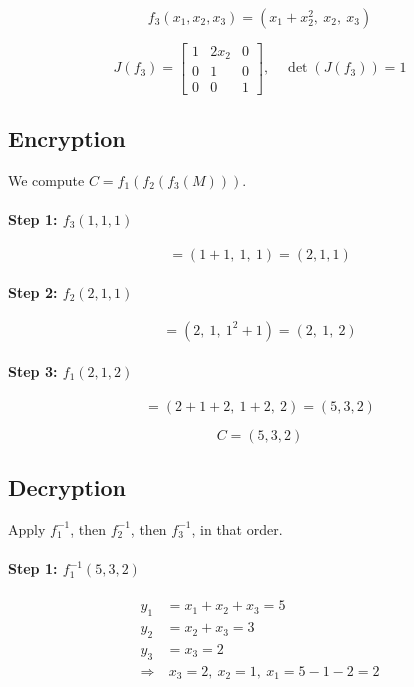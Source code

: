 \documentclass[12pt]{article}
\begin{document}
\[
f_3(x_1, x_2, x_3) = (x_1 + x_2^2,\ x_2,\ x_3)
\]

\[
J(f_3) =
\begin{bmatrix}
1 & 2x_2 & 0 \\
0 & 1 & 0 \\
0 & 0 & 1
\end{bmatrix}, \quad \det(J(f_3)) = 1
\]

\subsection*{Encryption}
We compute \( C = f_1(f_2(f_3(M))) \).

\paragraph{Step 1: \( f_3(1, 1, 1) \)}

\[
= (1 + 1,\ 1,\ 1) = (2, 1, 1)
\]

\paragraph{Step 2: \( f_2(2, 1, 1) \)}

\[
= (2,\ 1,\ 1^2 + 1) = (2,\ 1,\ 2)
\]

\paragraph{Step 3: \( f_1(2, 1, 2) \)}

\[
= (2 + 1 + 2,\ 1 + 2,\ 2) = (5, 3, 2)
\]

\[
C = (5, 3, 2)
\]

\subsection*{Decryption}
Apply \( f_1^{-1} \), then \( f_2^{-1} \), then \( f_3^{-1} \), in that order.

\paragraph{Step 1: \( f_1^{-1}(5, 3, 2) \)}

\[
\begin{aligned}
y_1 &= x_1 + x_2 + x_3 = 5 \\
y_2 &= x_2 + x_3 = 3 \\
y_3 &= x_3 = 2 \\
\Rightarrow &\ x_3 = 2,\ x_2 = 1,\ x_1 = 5 - 1 - 2 = 2
\end{aligned}
\]
\end{document}
